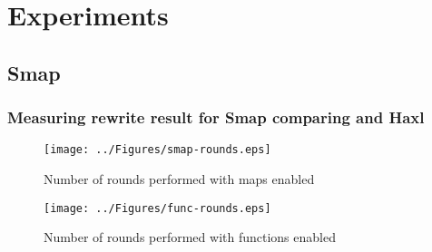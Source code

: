 \chapter{Experiments}

\label{ChapterExperiments}

\section{Smap}

\subsection{Measuring rewrite result for Smap comparing \yauhau{} and Haxl}

\begin{figure}
    \texttt{[image: ../Figures/smap-rounds.eps]}
    \caption{Number of rounds performed with maps enabled}
\end{figure}

\begin{figure}
    \texttt{[image: ../Figures/func-rounds.eps]}
    \caption{Number of rounds performed with functions enabled}
\end{figure}
